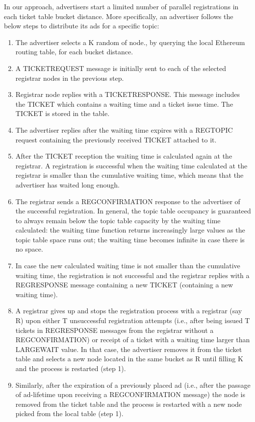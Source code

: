 In our approach,  advertisers start a limited number of parallel registrations in each ticket table bucket distance.
 More specifically, an advertiser follows the below steps to distribute its ads for a specific topic:
\begin{enumerate}
    \item The advertiser selects a K random of node.,  by querying the local Ethereum routing table,  for each bucket distance.
    \item A TICKETREQUEST message is initially sent to each of the selected registrar nodes in the previous step.
    \item Registrar node replies with a TICKETRESPONSE.  This message includes the TICKET which contains a waiting time and a ticket issue time.  The TICKET is stored in the table.
    \item The advertiser replies after the waiting time expires with a REGTOPIC request containing the previously received TICKET attached to it.
    \item After the TICKET reception the waiting time is calculated again at the registrar.  A registration is successful when the waiting time calculated at the registrar is smaller than the cumulative waiting time,  which means that the advertiser has waited long enough.
    \item The registrar sends a REGCONFIRMATION response to the advertiser of the successful registration. In general, the topic table occupancy is guaranteed to always remain below the topic table capacity by the waiting time calculated: the waiting time function returns increasingly large values as the topic table space runs out; the waiting time becomes infinite in case there is no space.
    \item In case the new calculated waiting time is not smaller than the cumulative waiting time, the registration is not successful and the registrar replies with a REGRESPONSE message containing a new TICKET (containing a new waiting time).
    \item A registrar gives up and stops the registration process with a registrar (say R) upon either T unsuccessful registration attempts (i.e., after being issued T tickets in REGRESPONSE messages from the registrar without a REGCONFIRMATION) or receipt of a ticket with a waiting time larger than LARGEWAIT value.  In that case,  the advertiser removes it from the ticket table and selects a new node located in the same bucket as R until filling K and the process is restarted (step 1).
    \item Similarly,  after the expiration of a previously placed ad (i.e., after the passage of ad-lifetime upon receiving a REGCONFIRMATION message) the node is removed from the ticket table and the process is restarted with a new node picked from the local table (step 1).
\end{enumerate}

